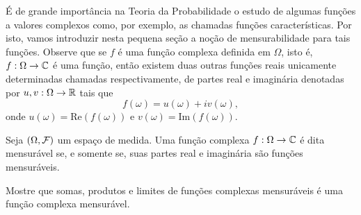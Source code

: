 É de grande importância na Teoria da Probabilidade 
o estudo de algumas funções a valores complexos
como, por exemplo, as chamadas funções 
características. 
Por isto, vamos introduzir nesta pequena seção a noção
de mensurabilidade para tais funções. Observe que 
se $f$ é uma função complexa definida em $\Omega$,
isto é, $f:\Omega\to\mathbb{C}$ é uma função, então existem
duas outras funções reais unicamente determinadas
chamadas respectivamente, de partes real e imaginária
denotadas por $u,v:\Omega\to\mathbb{R}$ tais que 
	\[
	f(\omega) =u(\omega)+iv(\omega),
	\]
onde $u(\omega)=\text{Re}(f(\omega))$ e
$v(\omega)=\text{Im}(f(\omega))$.
\begin{definicao}
Seja $(\Omega,\mathcal{F})$ um espaço de medida. 
Uma função complexa $f:\Omega\to\mathbb{C}$ é dita 
mensurável se, e somente se, suas partes 
real e imaginária são funções mensuráveis.
\end{definicao} 

\begin{exercicio}
Mostre que somas, produtos e limites de funções complexas 
mensuráveis é uma função complexa mensurável.
\end{exercicio}








